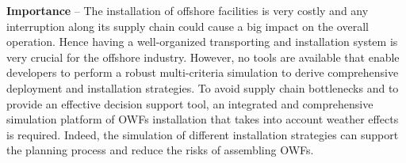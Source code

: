 \textbf{Importance} --
The installation of offshore facilities is very costly and any interruption along its supply chain could cause a big impact on the overall operation. Hence having a well-organized transporting and installation system is very crucial for the offshore industry.
However, no tools are available that enable developers to perform a robust multi-criteria simulation to derive comprehensive deployment and installation strategies. To avoid supply chain bottlenecks and to provide an effective decision support tool, an integrated and comprehensive simulation platform of OWFs installation that takes into account weather effects is required. Indeed, the simulation of different installation strategies can support the planning process and reduce the risks of assembling OWFs.
